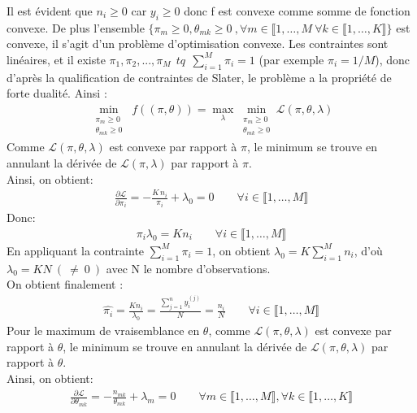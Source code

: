 \documentclass{article}
\begin{document}
Il est évident que $n_i \geq 0$ car $y_i \geq 0$ donc f est convexe comme somme de fonction convexe. De plus l'ensemble $\{\pi_m\geq0 ,\theta_{mk}\geq0 \ , \forall m \in \llbracket 1,\ldots,M \ \forall k \in \llbracket 1,\ldots,K \rrbracket\}$ est convexe, il s'agit d'un problème d'optimisation convexe. Les contraintes sont linéaires, et il existe $\pi_1,\pi_2,...,\pi_M  \ \ tq \ \ \sum_{i=1}^{M}{\pi_i}=1$ (par exemple $\pi_i=1/M$), donc d'après la qualification de contraintes de Slater, le problème a la propriété de forte dualité. Ainsi :
\begin{align*}
\min_{\substack{\pi_m\geq0\\\theta_{mk}\geq0}}\;f((\pi,\theta))=\max_\lambda \min_{\substack{\pi_m\geq0\\\theta_{mk}\geq0}} \mathcal{L}(\pi,\theta,\lambda)
\end{align*}
Comme $\mathcal{L}(\pi,\theta,\lambda)$ est convexe par rapport à $\pi$, le minimum se trouve en annulant la dérivée de $\mathcal{L}(\pi,\lambda)$ par rapport à $\pi$.
\\Ainsi, on obtient:
\begin{align*}
\frac{\partial \mathcal{L}}{\partial \pi_i} = -\frac{K\,n_i}{\pi_i}+\lambda_0=0 \qquad \forall i\in \llbracket 1,\ldots,M \rrbracket 
\end{align*}
Donc:
\begin{align*} 
\pi_i\lambda_0=Kn_i \qquad \forall i\in \llbracket 1,\ldots,M \rrbracket 
\end{align*}
En appliquant la contrainte $\sum_{i=1}^{M}{\pi_i}=1$, on obtient $\lambda_0= K\sum_{i=1}^{M}{n_i}$, d'où $\lambda_0=KN~(~\neq~0~)$ avec N le nombre d'observations.
\\On obtient finalement : 
\begin{align*} 
\widehat{\pi_i}=\frac{Kn_i}{\lambda_0} 
=\frac{\sum_{j=1}^{n}{y_i^{(j)}}}{N}
=\frac{n_i}{N}
\qquad \forall i\in \llbracket 1,\ldots,M \rrbracket 
\end{align*}
Pour le maximum de vraisemblance en $\theta$, comme $\mathcal{L}(\pi,\theta,\lambda)$ est convexe par rapport à $\theta$, le minimum se trouve en annulant la dérivée de $\mathcal{L}(\pi,\theta,\lambda)$ par rapport à $\theta$.
\\Ainsi, on obtient:
\begin{align*}
\frac{\partial \mathcal{L}}{\partial \theta_{mk}} = -\frac{n_{mk}}{\theta_{mk}}+\lambda_m=0 \qquad \forall m\in \llbracket 1,\ldots,M \rrbracket, \forall k\in \llbracket 1,\ldots,K \rrbracket
\end{align*}
\end{document}
